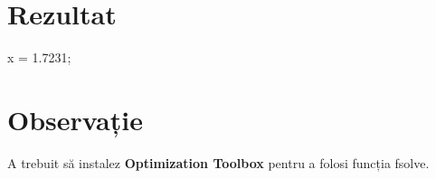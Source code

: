 \documentclass{article}
\begin{document}
\section*{Rezultat}
\begin{center}
   x = 1.7231;
\end{center}
\section*{Observație}
A trebuit să instalez \textbf{Optimization Toolbox} pentru a folosi funcția fsolve.
\end{document}
